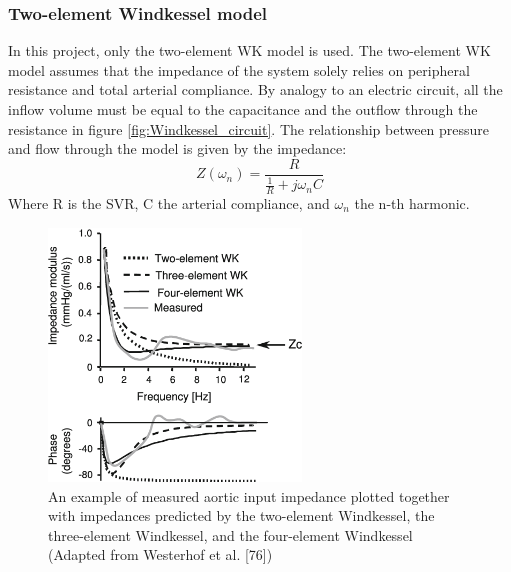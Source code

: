 \subsubsection{Two-element Windkessel model}

In this project, only the two-element WK model is used. The two-element WK model assumes that the impedance of the system solely relies on peripheral resistance and total arterial compliance. By analogy to an electric circuit, all the inflow volume must be equal to the capacitance and the outflow through the resistance in figure \ref{fig:Windkessel_circuit}. The relationship between pressure and flow through the model is given by the impedance:
\begin{equation}
    Z(\omega_n) = \frac{R}{\frac{1}{R}+j\omega_n C}
    \label{eq:pressure&flow}
\end{equation}
Where R is the SVR, C the arterial compliance, and $\omega_n$ the n-th harmonic.

\begin{figure}[h!]
    \centering
    \includegraphics[width=0.6\textwidth]{fig/theory/windkessel_impedance.png}
    \caption{An example of measured aortic input impedance plotted together with impedances predicted by the two-element Windkessel, the three-element Windkessel, and the four-element Windkessel (Adapted from Westerhof et al. [76])}
    \label{fig:windkessel_impedance}
\end{figure}{}


\cleardoublepage